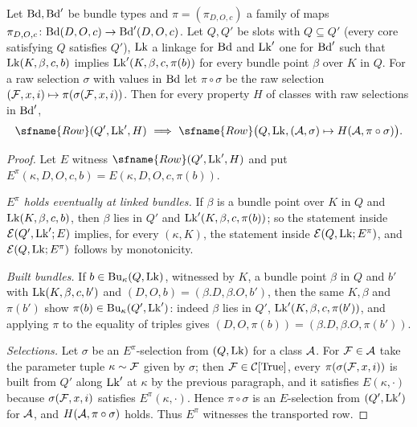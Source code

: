 \begin{lemma}\label{pf:sh-misc:rowmap}
Let $\mathrm{Bd},\mathrm{Bd}'$ be bundle types and $\pi=(\pi_{D,O,c})$ a family of maps $\pi_{D,O,c}\colon\mathrm{Bd}(D,O,c)\to
\mathrm{Bd}'(D,O,c)$. Let $Q,Q'$ be slots with $Q\subseteq Q'$ (every core satisfying $Q$ satisfies $Q'$), $\mathrm{Lk}$ a
linkage for $\mathrm{Bd}$ and $\mathrm{Lk}'$ one for $\mathrm{Bd}'$ such that $\mathrm{Lk}(K,\beta,c,b)$ implies
$\mathrm{Lk}'(K,\beta,c,\pi(b))$ for every bundle point $\beta$ over $K$ in $Q$. For a raw selection $\sigma$ with values in
$\mathrm{Bd}$ let $\pi\circ\sigma$ be the raw selection $(\mathcal{F},x,i)\mapsto\pi(\sigma(\mathcal{F},x,i))$. Then for every
property $H$ of classes with raw selections in $\mathrm{Bd}'$,
\[
\sfname{Row}(Q',\shmiscLk',H)\ \Longrightarrow\ \sfname{Row}\bigl(Q,\shmiscLk,(\shmiscA,\sigma)\mapsto H(\shmiscA,\pi\circ\sigma)\bigr).
\]
\end{lemma}

\begin{proof}
Let $E$ witness $\sfname{Row}(Q',\shmiscLk',H)$ and put $E^\pi(\kappa,D,O,c,b)=E(\kappa,D,O,c,\pi(b))$.

\emph{$E^\pi$ holds eventually at linked bundles.} If $\beta$ is a bundle point over $K$ in $Q$ and $\mathrm{Lk}(K,\beta,c,b)$, then
$\beta$ lies in $Q'$ and $\mathrm{Lk}'(K,\beta,c,\pi(b))$; so the statement inside $\mathcal{E}(Q',\mathrm{Lk}';E)$ implies, for
every $(\kappa,K)$, the statement inside $\mathcal{E}(Q,\mathrm{Lk};E^\pi)$, and $\mathcal{E}(Q,\mathrm{Lk};E^\pi)$ follows by monotonicity.

\emph{Built bundles.} If $b\in\mathrm{Bu}_\kappa(Q,\mathrm{Lk})$, witnessed by $K$, a bundle point $\beta$ in $Q$ and $b'$ with
$\mathrm{Lk}(K,\beta,c,b')$ and $(D,O,b)=(\beta.D,\beta.O,b')$, then the same $K,\beta$ and $\pi(b')$ show
$\pi(b)\in\mathrm{Bu}_\kappa(Q',\mathrm{Lk}')$: indeed $\beta$ lies in $Q'$, $\mathrm{Lk}'(K,\beta,c,\pi(b'))$, and applying $\pi$ to the
equality of triples gives $(D,O,\pi(b))=(\beta.D,\beta.O,\pi(b'))$.

\emph{Selections.} Let $\sigma$ be an $E^\pi$-selection from $(Q,\mathrm{Lk})$ for a class $\mathcal{A}$. For $\mathcal{F}\in\mathcal{A}$
take the parameter tuple $\kappa\sim\mathcal{F}$ given by $\sigma$; then $\mathcal{F}\in\mathcal{C}[\mathrm{True}]$, every
$\pi(\sigma(\mathcal{F},x,i))$ is built from $Q'$ along $\mathrm{Lk}'$ at $\kappa$ by the previous paragraph, and it satisfies
$E(\kappa,\cdot)$ because $\sigma(\mathcal{F},x,i)$ satisfies $E^\pi(\kappa,\cdot)$. Hence $\pi\circ\sigma$ is an $E$-selection from
$(Q',\mathrm{Lk}')$ for $\mathcal{A}$, and $H(\mathcal{A},\pi\circ\sigma)$ holds. Thus $E^\pi$ witnesses the transported row.
\end{proof}

